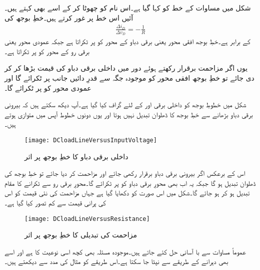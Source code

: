 شکل  میں مساوات   کے خط کو  کہا گیا ہے۔اس نام کو چھوٹا کر کے اسے   بھی کہتے ہیں۔آئیں اس خط پر غور کرتے ہیں۔خطِ بوجھ کی 
\begin{align*}
\frac{\Delta i_D}{\Delta v_D}=-\frac{1}{R}
\end{align*}
کے برابر ہے۔خطِ بوجھ افقی محور یعنی برقی دباو  کے محور کو  پر ٹکراتا ہے جبکہ عمودی محور یعنی برقی رو  کے محور کو   پر ٹکراتا ہے۔

یوں اگر مزاحمت برقرار رکھتے ہوئے دور میں داخلی برقی دباو  کی قیمت بڑھا کر  کر دی جائے تو خطِ بوجھ افقی محور کو موجودہ جگہ سے قدرِ دائیں جانب  پر ٹکرائے گا اور عمودی محور کو    پر ٹکرائے گا۔

شکل   میں خطوطِ بوجھ کو داخلی برقی   اور  کے لئے گراف کیا گیا ہے۔آپ دیکھ سکتے ہیں کہ بیرونی برقی دباو بڑھانے سے  خطِ بوجھ کا ڈھلوان تبدیل نہیں ہوتا اور یوں دونوں خطوط آپس میں متوازی ہوتے ہیں۔
\begin{figure}
\centering
\texttt{[image: DCloadLineVersusInputVoltage]}
\caption{داخلی برقی دباو کا خطِ بوجھ پر اثر}
\label{شکل_داخلی_برقی_دباو_کا_بار_کے_خط_پر_اثر}
\end{figure}
اس کے برعکس اگر بیرونی برقی دباو  برقرار رکھی جائے اور مزاحمت  کر دیا جائے تو خطِ بوجھ کی ڈھلوان تبدیل ہو گا جبکہ یہ اب بھی محورِ برقی دباو کو  پر ٹکرائے گا۔محورِ برقی رو سے ٹکرانے کا مقام تبدیل ہو کر  ہو جائے گا۔شکل   میں اس صورت کو دکھایا گیا ہے جہاں مزاحمت کی نئی قیمت  کو اس کی پرانی قیمت  سے کم تصور کیا گیا ہے۔
\begin{figure}
\centering
\texttt{[image: DCloadLineVersusResistance]}
\caption{مزاحمت کی تبدیلی کا خطِ بوجھ پر اثر}
\label{شکل_مزاحمت_کا_بار_کے_خط_پر_اثرات}
\end{figure}
عموماً مساوات   سے با آسانی حل کئے جاتے ہیں۔موجودہ مسئلہ بھی کچھ اسی نوعیت کا ہے اور اسے بھی دہرانے کے طریقے سے نپٹا جا سکتا ہے۔اس طریقے کو مثال کی مدد سے دیکھتے ہیں۔

